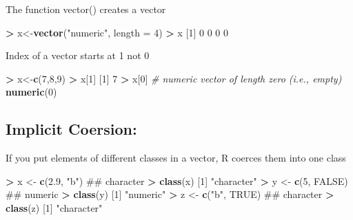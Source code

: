 \documentclass[]{article}
\newenvironment{Shaded}{\begin{snugshade}}{\end{snugshade}}
\newcommand{\KeywordTok}[1]{\textcolor[rgb]{0.13,0.29,0.53}{\textbf{#1}}}
\newcommand{\DataTypeTok}[1]{\textcolor[rgb]{0.13,0.29,0.53}{#1}}
\newcommand{\DecValTok}[1]{\textcolor[rgb]{0.00,0.00,0.81}{#1}}
\newcommand{\FloatTok}[1]{\textcolor[rgb]{0.00,0.00,0.81}{#1}}
\newcommand{\StringTok}[1]{\textcolor[rgb]{0.31,0.60,0.02}{#1}}
\newcommand{\CommentTok}[1]{\textcolor[rgb]{0.56,0.35,0.01}{\textit{#1}}}
\newcommand{\OtherTok}[1]{\textcolor[rgb]{0.56,0.35,0.01}{#1}}
\newcommand{\OperatorTok}[1]{\textcolor[rgb]{0.81,0.36,0.00}{\textbf{#1}}}
\newcommand{\NormalTok}[1]{#1}
\begin{document}
The function vector() creates a vector

\begin{Shaded}
\begin{Highlighting}[]
\OperatorTok{>}\StringTok{ }\NormalTok{x<-}\KeywordTok{vector}\NormalTok{(}\StringTok{"numeric"}\NormalTok{, }\DataTypeTok{length =} \DecValTok{4}\NormalTok{)}
\OperatorTok{>}\StringTok{ }\NormalTok{x}
\NormalTok{[}\DecValTok{1}\NormalTok{] }\DecValTok{0} \DecValTok{0} \DecValTok{0} \DecValTok{0}
\end{Highlighting}
\end{Shaded}

Index of a vector starts at 1 not 0

\begin{Shaded}
\begin{Highlighting}[]
\OperatorTok{>}\StringTok{ }\NormalTok{x<-}\KeywordTok{c}\NormalTok{(}\DecValTok{7}\NormalTok{,}\DecValTok{8}\NormalTok{,}\DecValTok{9}\NormalTok{)}
\OperatorTok{>}\StringTok{ }\NormalTok{x[}\DecValTok{1}\NormalTok{]}
\NormalTok{[}\DecValTok{1}\NormalTok{] }\DecValTok{7}
\OperatorTok{>}\StringTok{ }\NormalTok{x[}\DecValTok{0}\NormalTok{] }\CommentTok{# numeric vector of length zero (i.e., empty)}
\KeywordTok{numeric}\NormalTok{(}\DecValTok{0}\NormalTok{)}
\end{Highlighting}
\end{Shaded}

\subsection{Implicit Coersion:}\label{implicit-coersion}

If you put elements of different classes in a vector, R coerces them
into one class

\begin{Shaded}
\begin{Highlighting}[]
\OperatorTok{>}\StringTok{ }\NormalTok{x <-}\StringTok{ }\KeywordTok{c}\NormalTok{(}\FloatTok{2.9}\NormalTok{, }\StringTok{"b"}\NormalTok{)   ## character }
\OperatorTok{>}\StringTok{ }\KeywordTok{class}\NormalTok{(x)}
\NormalTok{[}\DecValTok{1}\NormalTok{] }\StringTok{"character"}
\OperatorTok{>}\StringTok{ }\NormalTok{y <-}\StringTok{ }\KeywordTok{c}\NormalTok{(}\DecValTok{5}\NormalTok{, }\OtherTok{FALSE}\NormalTok{)    ## numeric }
\OperatorTok{>}\StringTok{ }\KeywordTok{class}\NormalTok{(y)}
\NormalTok{[}\DecValTok{1}\NormalTok{] }\StringTok{"numeric"}
\OperatorTok{>}\StringTok{ }\NormalTok{z <-}\StringTok{ }\KeywordTok{c}\NormalTok{(}\StringTok{"b"}\NormalTok{, }\OtherTok{TRUE}\NormalTok{)  ## character}
\OperatorTok{>}\StringTok{ }\KeywordTok{class}\NormalTok{(z)}
\NormalTok{[}\DecValTok{1}\NormalTok{] }\StringTok{"character"}
\end{Highlighting}
\end{Shaded}
\end{document}
